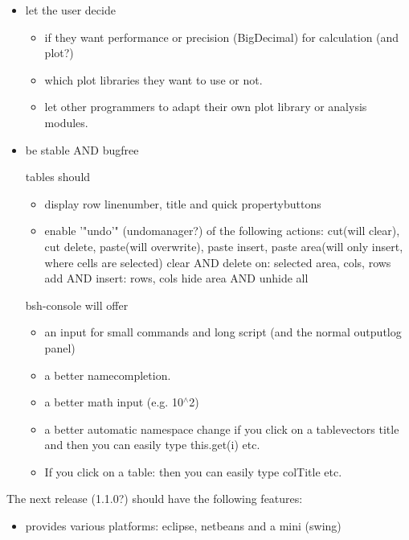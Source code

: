\documentclass[12pt]{article}
\begin{document}
\begin{itemize}
\begin{itemize}
\end{itemize}
\item let the user decide
\begin{itemize}
	\item if they want performance or precision (BigDecimal) for calculation (and plot?)
	\item which plot libraries they want to use or not.
	\item let other programmers to adapt their own plot library or analysis modules.
\end{itemize}
\item be stable AND bugfree

\item[tables should]
\begin{itemize} 
	\item display row linenumber, title and quick propertybuttons\\
	\item enable '"undo'" (undomanager?) of the following actions:
cut(will clear), cut delete, paste(will overwrite), paste insert, 
paste area(will only insert, where cells are selected)
clear AND delete on: selected area, cols, rows
add AND insert: rows, cols
hide area AND unhide all
\end{itemize}
\item[bsh-console will offer]
\begin{itemize}
	\item an input for small commands and long script (and the normal outputlog panel)
	\item a better namecompletion.
	\item a better math input (e.g. 10$^\wedge$2)
	\item a better automatic namespace change if you click on a tablevectors title and
	then you can easily type this.get(i) etc.
	\item If you click on a table: then you can easily type colTitle etc.
\end{itemize}
\end{itemize}%

The next release (1.1.0?) should have the following features:
\begin{itemize}
\item    provides various platforms: eclipse, netbeans and a mini (swing)
\end{itemize}
\end{document}
